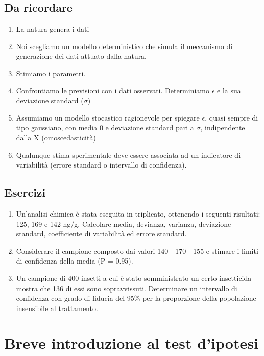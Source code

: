 \documentclass[a4paper,12pt,oneside]{book}
\providecommand{\tightlist}{%
  \setlength{\itemsep}{0pt}\setlength{\parskip}{0pt}}
\theoremstyle{definition}
\theoremstyle{definition}
\theoremstyle{definition}
\theoremstyle{remark}
\begin{document}
\section{Da ricordare}\label{da-ricordare}

\begin{enumerate}
\def\labelenumi{\arabic{enumi}.}
\tightlist
\item
  La natura genera i dati
\item
  Noi scegliamo un modello deterministico che simula il meccanismo di
  generazione dei dati attuato dalla natura.
\item
  Stimiamo i parametri.
\item
  Confrontiamo le previsioni con i dati osservati. Determiniamo
  \(\epsilon\) e la sua deviazione standard (\(\sigma\))
\item
  Assumiamo un modello stocastico ragionevole per spiegare \(\epsilon\),
  quasi sempre di tipo gaussiano, con media 0 e deviazione standard pari
  a \(\sigma\), indipendente dalla X (omoscedasticità)
\item
  Qualunque stima sperimentale deve essere associata ad un indicatore di
  variabilità (errore standard o intervallo di confidenza).
\end{enumerate}

\section{Esercizi}\label{esercizi}

\begin{enumerate}
\def\labelenumi{\arabic{enumi}.}
\tightlist
\item
  Un'analisi chimica è stata eseguita in triplicato, ottenendo i
  seguenti risultati: 125, 169 e 142 ng/g. Calcolare media, devianza,
  varianza, deviazione standard, coefficiente di variabilità ed errore
  standard.
\item
  Considerare il campione composto dai valori 140 - 170 - 155 e stimare
  i limiti di confidenza della media (P = 0.95).
\item
  Un campione di 400 insetti a cui è stato somministrato un certo
  insetticida mostra che 136 di essi sono sopravvissuti. Determinare un
  intervallo di confidenza con grado di fiducia del 95\% per la
  proporzione della popolazione insensibile al trattamento.
\end{enumerate}

\chapter{Breve introduzione al test
d'ipotesi}\label{breve-introduzione-al-test-dipotesi}
\end{document}

